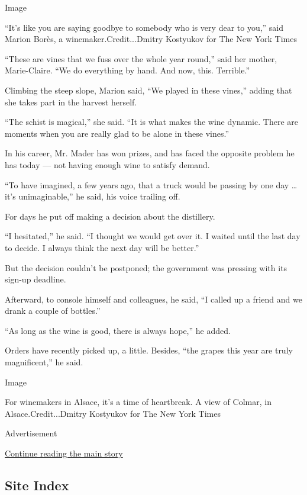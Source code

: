Image

``It's like you are saying goodbye to somebody who is very dear to
you,'' said Marion Borès, a winemaker.Credit...Dmitry Kostyukov for The
New York Times

``These are vines that we fuss over the whole year round,'' said her
mother, Marie-Claire. ``We do everything by hand. And now, this.
Terrible.''

Climbing the steep slope, Marion said, ``We played in these vines,''
adding that she takes part in the harvest herself.

``The schist is magical,'' she said. ``It is what makes the wine
dynamic. There are moments when you are really glad to be alone in these
vines.''

In his career, Mr. Mader has won prizes, and has faced the opposite
problem he has today --- not having enough wine to satisfy demand.

``To have imagined, a few years ago, that a truck would be passing by
one day \ldots{} it's unimaginable,'' he said, his voice trailing off.

For days he put off making a decision about the distillery.

``I hesitated,'' he said. ``I thought we would get over it. I waited
until the last day to decide. I always think the next day will be
better.''

But the decision couldn't be postponed; the government was pressing with
its sign-up deadline.

Afterward, to console himself and colleagues, he said, ``I called up a
friend and we drank a couple of bottles.''

``As long as the wine is good, there is always hope,'' he added.

Orders have recently picked up, a little. Besides, ``the grapes this
year are truly magnificent,'' he said.

Image

For winemakers in Alsace, it's a time of heartbreak. A view of Colmar,
in Alsace.Credit...Dmitry Kostyukov for The New York Times

Advertisement

\protect\hyperlink{after-bottom}{Continue reading the main story}

\hypertarget{site-index}{%
\subsection{Site Index}\label{site-index}}

